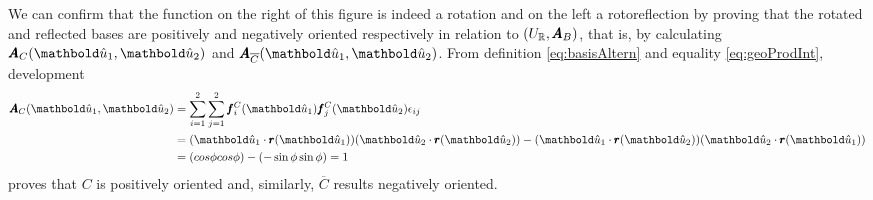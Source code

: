 \begin{figure}[!ht]
\centering
\begin{center}
\scalebox{.72}{}
\end{center}
\label{fg:rotoReflex}
\end{figure}
We can confirm that the function on the right of this figure is indeed a rotation and on the left a rotoreflection by proving that the rotated and reflected bases are positively and negatively oriented respectively in relation to $(U_{\mathbb{R}},\pmb{A}_B)$, that is, by calculating $\fua{\tnr{A}_C}{\vun{u}_1,\vun{u}_2}$ and $\fua{\tnr{A}_{\overline{C}}}{\vun{u}_1,\vun{u}_2}$. From definition \eqref{eq:basisAltern} and equality \eqref{eq:geoProdInt}, development
\begin{align*}
\fua{\tnr{A}_{C}}{\vun{u}_1,\vun{u}_2}&=\sum_{i=1}^2\sum_{j=1}^2\fua{\vtf{f}^\con{C}_{i}}{\vun{u}_1}\fua{\vtf{f}^\con{C}_{j}}{\vun{u}_2}\epsilon_{ij}\\
&=(\vun{u}_1\cdot\fua{\vtf{r}}{\vun{u}_1})(\vun{u}_2\cdot\fua{\vtf{r}}{\vun{u}_2})-(\vun{u}_1\cdot\fua{\vtf{r}}{\vun{u}_2})(\vun{u}_2\cdot\fua{\vtf{r}}{\vun{u}_1})\\
&=(cos\phi cos\phi) - (-\sin\phi\sin\phi)=1
\end{align*}
proves that $C$ is positively oriented and, similarly, $\overline{C}$ results negatively oriented.


